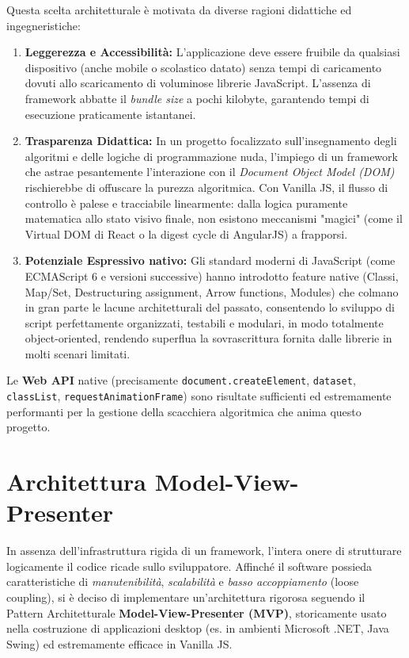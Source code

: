 \documentclass[openany]{theme/uniprthesis}
\begin{document}
Questa scelta architetturale è motivata da diverse ragioni didattiche ed ingegneristiche:
\begin{enumerate}
    \item \textbf{Leggerezza e Accessibilità:} L'applicazione deve essere fruibile da qualsiasi dispositivo (anche mobile o scolastico datato) senza tempi di caricamento dovuti allo scaricamento di voluminose librerie JavaScript. L'assenza di framework abbatte il \textit{bundle size} a pochi kilobyte, garantendo tempi di esecuzione praticamente istantanei.
    \item \textbf{Trasparenza Didattica:} In un progetto focalizzato sull'insegnamento degli algoritmi e delle logiche di programmazione nuda, l'impiego di un framework che astrae pesantemente l'interazione con il \textit{Document Object Model (DOM)} rischierebbe di offuscare la purezza algoritmica. Con Vanilla JS, il flusso di controllo è palese e tracciabile linearmente: dalla logica puramente matematica allo stato visivo finale, non esistono meccanismi "magici" (come il Virtual DOM di React o la digest cycle di AngularJS) a frapporsi.
    \item \textbf{Potenziale Espressivo nativo:} Gli standard moderni di JavaScript (come ECMAScript 6 e versioni successive) hanno introdotto feature native (Classi, Map/Set, Destructuring assignment, Arrow functions, Modules) che colmano in gran parte le lacune architetturali del passato, consentendo lo sviluppo di script perfettamente organizzati, testabili e modulari, in modo totalmente object-oriented, rendendo superflua la sovrascrittura fornita dalle librerie in molti scenari limitati.
\end{enumerate}

Le \textbf{Web API} native (precisamente \texttt{document.createElement}, \texttt{dataset}, \texttt{classList}, \texttt{requestAnimationFrame}) sono risultate sufficienti ed estremamente performanti per la gestione della scacchiera algoritmica che anima questo progetto.

\section{Architettura Model-View-Presenter}
In assenza dell'infrastruttura rigida di un framework, l'intera onere di strutturare logicamente il codice ricade sullo sviluppatore. Affinché il software possieda caratteristiche di \textit{manutenibilità}, \textit{scalabilità} e \textit{basso accoppiamento} (loose coupling), si è deciso di implementare un'architettura rigorosa seguendo il Pattern Architetturale \textbf{Model-View-Presenter (MVP)}, storicamente usato nella costruzione di applicazioni desktop (es. in ambienti Microsoft .NET, Java Swing) ed estremamente efficace in Vanilla JS.
\end{document}
